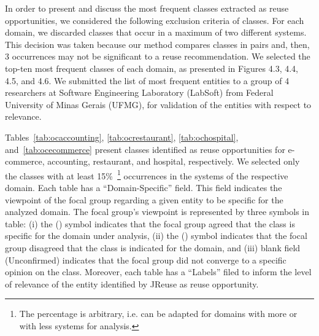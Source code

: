 In order to present and discuss the most frequent classes extracted as reuse opportunities, we considered the following exclusion criteria of classes. For each domain, we discarded classes that occur in a maximum of two different systems. This decision was taken because our method compares classes in pairs and, then, 3 occurrences may not be significant to a reuse recommendation. We selected the top-ten most frequent classes of each domain, as presented in Figures 4.3, 4.4, 4.5, and 4.6. We submitted the list of most frequent entities to a group of 4 researchers at Software Engineering Laboratory (LabSoft) from Federal University of Minas Gerais (UFMG), for validation of the entities with respect to relevance. 



Tables~\ref{tab:ocaccounting}, \ref{tab:ocrestaurant}, \ref{tab:ochospital}, and~\ref{tab:ocecommerce} present classes identified as reuse opportunities for e-commerce, accounting, restaurant, and hospital, respectively. We selected only the classes with at least 15\%~\footnote{The percentage is arbitrary, i.e. can be adapted for domains with more or with less systems for analysis.} occurrences in the systems of the respective domain. Each table has a ``Domain-Specific'' field. This field indicates the viewpoint of the focal group regarding a given entity to be specific for the analyzed domain. The focal group's viewpoint is represented by three symbols in table: (i) the (\checkmark) symbol indicates that the focal group agreed that the class is  specific for the domain under analysis, (ii) the (\xmark) symbol indicates that the focal group disagreed that the class is indicated for the domain, and (iii) blank field (Unconfirmed) indicates that the focal group did not converge to a specific opinion on the class. Moreover, each table has a ``Labels'' filed to inform the level of relevance of the entity identified by JReuse as reuse opportunity.


